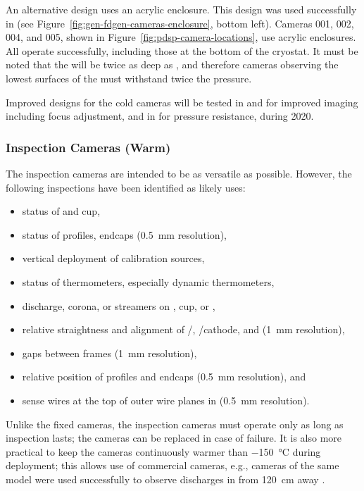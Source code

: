 An alternative design uses an acrylic enclosure.
This design was used successfully in  (see Figure~\ref{fig:gen-fdgen-cameras-enclosure}, bottom left). Cameras 001, 002, 004, and 005, shown in Figure~\ref{fig:pdsp-camera-locations}, use acrylic enclosures. 
All operate successfully, including those at the bottom of the cryostat.  It must be noted that the   will be twice as deep as , and therefore cameras observing the lowest surfaces of the  must withstand twice the pressure.

Improved designs for the cold cameras will be tested in  and  for improved imaging including focus adjustment, and in  for pressure resistance, during 2020. 



\subsubsection{Inspection Cameras (Warm)}

The inspection cameras are intended to be as versatile as possible.
However, the following %
inspections have been identified as likely uses:
\begin{itemize}
\item status of  \fdth and cup,
\item status of  profiles, endcaps (\SI{0.5}{mm} resolution),
\item vertical deployment of calibration sources,
\item status of thermometers, especially dynamic thermometers,
\item {} discharge, corona, or streamers on  \fdth, cup, or ,
\item relative straightness and alignment of /, /cathode, and  (\SI{1}{mm} resolution),
\item gaps between  frames (\SI{1}{mm} resolution),
\item relative position of profiles and endcaps (\SI{0.5}{mm} resolution), and 
\item sense wires at the top of outer wire planes in \single {} (\SI{0.5}{mm} resolution).
\end{itemize}

Unlike the fixed cameras, the inspection cameras must operate only as
long as inspection lasts; the cameras can be replaced in case of failure.  It
is also more practical to keep the cameras continuously warmer than
 \SI{-150}{\celsius} during deployment; this allows use of  %
commercial cameras, %
e.g., cameras of the same model were used successfully to observe discharges
in  from \SI{120}{cm} away \cite{Auger:2015xlo}.



